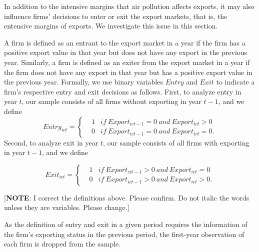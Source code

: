 \documentclass[12pt]{article}
\begin{document}
\label{sec:4.2} In addition to the intensive margins that air pollution
affects exports, it may also influence firms' decisions to enter or exit the
export markets, that is, the entensive margins of exports. We investigate
this issue in this section.

A firm is defined as an entrant to the export market in a year if the firm
has a positive export value in that year but does not have any export in the
previous year. Similarly, a firm is defined as an exiter from the export
market in a year if the firm does not have any export in that year but has a
positive export value in the previous year. Formally, we use binary
variables $Entry$ and $Exit$ to indicate a firm's respective entry and exit
decisions as follows. First, to analyze entry in year $t$, our sample
consists of all firms without exporting in year $t-1$, and we define 
\begin{equation*}
Entry_{ict}=\left\{ \begin{aligned} & 1 & if \ Export_{ict-1} = 0 \ and \
Export_{ict} > 0 \\ & 0 & if \ Export_{ict-1} = 0 \ and \ Export_{ict} = 0.
\end{aligned}\right.
\end{equation*}%
Second, to analyze exit in year $t$, our sample consists of all firms with
exporting in year $t-1$, and we define

\begin{equation*}
Exit_{ict}=\left\{ \begin{aligned} & 1 & if \ Export_{cit-1} > 0 \ and \
Export_{ict} = 0 \\ & 0 & if \ Export_{ict-1} > 0 \ and \ Export_{ict} > 0.
\end{aligned}\right.
\end{equation*}

[\textbf{NOTE}: I correct the definitions above. Please confirm. Do not
italic the words unless they are variables. Please change.]

As the definition of entry and exit in a given period requires the
information of the firm's exporting status in the previous period, the
first-year observation of each firm is dropped from the sample.
\end{document}
